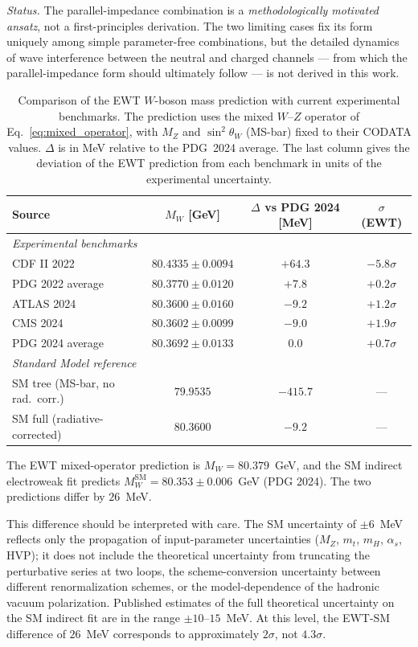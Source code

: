 \documentclass[10pt,a4paper]{article}
\begin{document}
\emph{Status.} The parallel-impedance combination is a
\emph{methodologically motivated ansatz}, not a first-principles
derivation. The two limiting cases fix its form uniquely among simple
parameter-free combinations, but the detailed dynamics of wave
interference between the neutral and charged channels --- from which
the parallel-impedance form should ultimately follow --- is not
derived in this work.
\begin{table}[ht]
	\centering
	\small
	\caption{Comparison of the EWT $W$-boson mass prediction with current
		experimental benchmarks. The prediction uses the mixed $W$--$Z$
		operator of Eq.~\eqref{eq:mixed_operator}, with $M_Z$ and
		$\sin^2\theta_W$ (MS-bar) fixed to their CODATA values. $\Delta$ is
		in MeV relative to the PDG~2024 average. The last column gives the
		deviation of the EWT prediction from each benchmark in units of the
		experimental uncertainty.}
	\label{tab:mw_comparison}
	\begin{tabular}{lccc}
		\toprule
		\textbf{Source} & \textbf{$M_W$ [GeV]} & \textbf{$\Delta$ vs PDG 2024 [MeV]} & \textbf{$\sigma$ (EWT)} \\
		\midrule
		\multicolumn{4}{l}{\textit{Experimental benchmarks}} \\
		\midrule
		CDF II 2022 & $80.4335 \pm 0.0094$ & $+64.3$ & $-5.8\sigma$ \\
		PDG 2022 average & $80.3770 \pm 0.0120$ & $+7.8$ & $+0.2\sigma$ \\
		ATLAS 2024 & $80.3600 \pm 0.0160$ & $-9.2$ & $+1.2\sigma$ \\
		CMS 2024 & $80.3602 \pm 0.0099$ & $-9.0$ & $+1.9\sigma$ \\
		PDG 2024 average & $80.3692 \pm 0.0133$ & $0.0$ & $+0.7\sigma$ \\
		\midrule
		\multicolumn{4}{l}{\textit{Standard Model reference}} \\
		\midrule
		SM tree (MS-bar, no rad.\ corr.) & $79.9535$ & $-415.7$ & --- \\
		SM full (radiative-corrected) & $80.3600$ & $-9.2$ & --- \\
		\bottomrule
	\end{tabular}
\end{table}

The EWT mixed-operator prediction is $M_W = 80.379$~GeV, and the
SM indirect electroweak fit predicts $M_W^{\text{SM}} = 80.353 \pm
0.006$~GeV (PDG 2024). The two predictions differ by $26$~MeV.

This difference should be interpreted with care. The SM uncertainty
of $\pm 6$~MeV reflects only the propagation of input-parameter
uncertainties ($M_Z$, $m_t$, $m_H$, $\alpha_s$, HVP); it does not
include the theoretical uncertainty from truncating the perturbative
series at two loops, the scheme-conversion uncertainty between
different renormalization schemes, or the model-dependence of the
hadronic vacuum polarization. Published estimates of the full
theoretical uncertainty on the SM indirect fit are in the range
$\pm 10$--$15$~MeV. At this level, the EWT-SM difference of $26$~MeV
corresponds to approximately $2\sigma$, not $4.3\sigma$.
\end{document}
